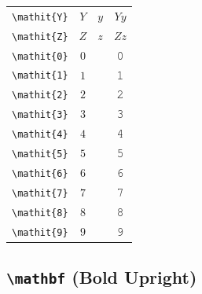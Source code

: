 \documentclass[12pt,a4paper]{article}
\begin{document}
\begin{longtable}{|c|c|c|c|}
\verb|\mathit{Y}| & $\mathit{Y}$ & $\mathit{y}$ & $ 𝑌 𝑦 $ \\
\verb|\mathit{Z}| & $\mathit{Z}$ & $\mathit{z}$ & $ 𝑍 𝑧 $ \\
\verb|\mathit{0}| & $\mathit{0}$ & & 𝟶 \\
\verb|\mathit{1}| & $\mathit{1}$ & & 𝟷 \\
\verb|\mathit{2}| & $\mathit{2}$ & & 𝟸 \\
\verb|\mathit{3}| & $\mathit{3}$ & & 𝟹 \\
\verb|\mathit{4}| & $\mathit{4}$ & & 𝟺 \\
\verb|\mathit{5}| & $\mathit{5}$ & & 𝟻 \\
\verb|\mathit{6}| & $\mathit{6}$ & & 𝟼 \\
\verb|\mathit{7}| & $\mathit{7}$ & & 𝟽 \\
\verb|\mathit{8}| & $\mathit{8}$ & & 𝟾 \\
\verb|\mathit{9}| & $\mathit{9}$ & & 𝟿 \\
\hline
\end{longtable}

\newpage

\subsection*{\texttt{\textbackslash{}mathbf} (Bold Upright)}
\end{document}
